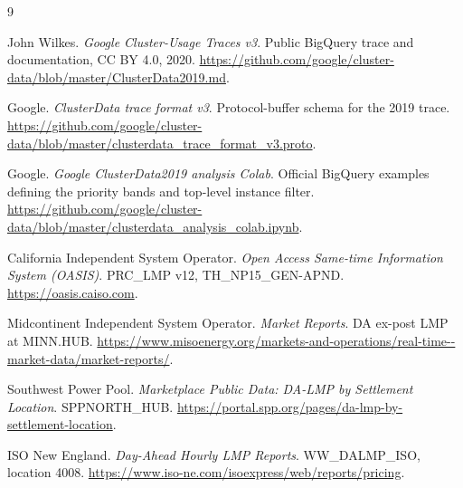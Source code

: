 \documentclass[12pt]{article}
\begin{document}
\begin{thebibliography}{9}

John Wilkes.
\newblock \emph{Google Cluster-Usage Traces v3}.
\newblock Public BigQuery trace and documentation, CC BY 4.0, 2020.
\newblock \url{https://github.com/google/cluster-data/blob/master/ClusterData2019.md}.

Google.
\newblock \emph{ClusterData trace format v3}.
\newblock Protocol-buffer schema for the 2019 trace.
\newblock \url{https://github.com/google/cluster-data/blob/master/clusterdata_trace_format_v3.proto}.

Google.
\newblock \emph{Google ClusterData2019 analysis Colab}.
\newblock Official BigQuery examples defining the priority bands and top-level
instance filter.
\newblock \url{https://github.com/google/cluster-data/blob/master/clusterdata_analysis_colab.ipynb}.

California Independent System Operator.
\newblock \emph{Open Access Same-time Information System (OASIS)}.
\newblock PRC\_LMP v12, TH\_NP15\_GEN-APND.
\newblock \url{https://oasis.caiso.com}.

Midcontinent Independent System Operator.
\newblock \emph{Market Reports}.
\newblock DA ex-post LMP at MINN.HUB.
\newblock \url{https://www.misoenergy.org/markets-and-operations/real-time--market-data/market-reports/}.

Southwest Power Pool.
\newblock \emph{Marketplace Public Data: DA-LMP by Settlement Location}.
\newblock SPPNORTH\_HUB.
\newblock \url{https://portal.spp.org/pages/da-lmp-by-settlement-location}.

ISO New England.
\newblock \emph{Day-Ahead Hourly LMP Reports}.
\newblock WW\_DALMP\_ISO, location 4008.
\newblock \url{https://www.iso-ne.com/isoexpress/web/reports/pricing}.

\end{thebibliography}
\end{document}
